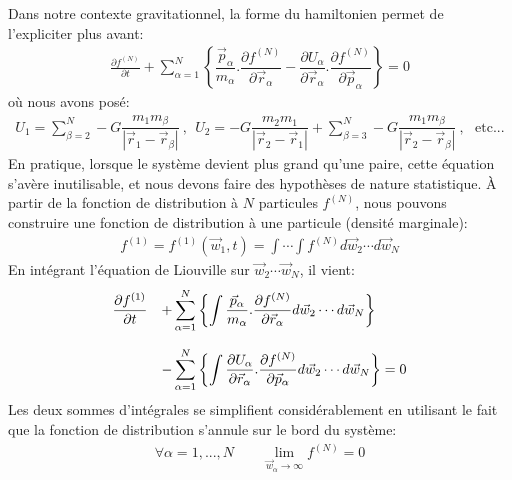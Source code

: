 Dans notre contexte gravitationnel, la forme du hamiltonien permet de
l'expliciter plus avant:
\begin{align*}
	\frac{\partial f^{(N)}}{\partial t}+\sum_{\alpha=1}^{N}\left\{  \dfrac{\vec{p}_{\alpha}}{m_{\alpha}}.\dfrac{\partial f^{(N)}}{\partial
	\vec{r}_{\alpha}}-\dfrac{\partial U_{\alpha}}{\partial\vec{r}_{\alpha}}.\dfrac{\partial f^{(N)}}{\partial\vec{p}_{\alpha}}\right\}  =0
\end{align*}
où nous avons posé:
\begin{align*}
	U_{1}=\displaystyle\sum\limits_{\beta=2}^{N}-G\dfrac{m_{1}m_{\beta}}{\left\vert \vec{r}_{1}-\vec{r}_{\beta}\right\vert }\ ,\ \ U_{2}%
	=-G\dfrac{m_{2}m_{1}}{\left\vert \vec{r}_{2}-\vec{r}_{1}\right\vert}+\displaystyle\sum\limits_{\beta=3}^{N}-G\dfrac{m_{1}m_{\beta}}{\left\vert
	\vec{r}_{2}-\vec{r}_{\beta}\right\vert }\ ,\ \ \ \text{etc...}
\end{align*}
En pratique, lorsque le système devient plus grand qu'une paire, cette équation s'avère inutilisable, et nous devons faire des hypothèses de nature
statistique. À partir de la fonction de distribution à $N$ particules $f^{(N)}$, nous pouvons construire une fonction de distribution à une particule
(densité marginale):
\begin{align*}
	f^{(1)}=f^{(1)}(\vec{w}_{1},t)=\int\cdots\int f^{(N)}d\vec{w}_{2}\cdots d\vec{w}_{N}
\end{align*}
En intégrant l'équation de Liouville sur $\vec{w}_{2}\cdots\vec{w}_{N}$, il vient:
\begin{align*}%
	\begin{array}[c]{ll}%
		\dfrac{\partial f^{(1)}}{\partial t} & +\displaystyle\sum\limits_{\alpha=1}^{N}\left\{  \displaystyle\int\dfrac{\vec{p}_{\alpha}}{m_{\alpha}%
		}.\dfrac{\partial f^{(N)}}{\partial\vec{r}_{\alpha}}d\vec{w}_{2}\cdots d\vec{w}_{N}\right\} \\
		& \\
		& -\displaystyle\sum\limits_{\alpha=1}^{N}\left\{  \displaystyle\int\dfrac{\partial U_{\alpha}}{\partial\vec{r}_{\alpha}}.\dfrac{\partial
		f^{(N)}}{\partial\vec{p}_{\alpha}}d\vec{w}_{2}\cdots d\vec{w}_{N}\right\}  =0
	\end{array}
\end{align*}
Les deux sommes d'intégrales se simplifient considérablement en utilisant le fait que la fonction de distribution s'annule sur le bord du système:
\begin{align*}
	\forall\alpha=1,...,N\qquad\lim_{\vec{w}_{\alpha}\rightarrow\infty}f^{\left(  N\right)  }=0
\end{align*}
